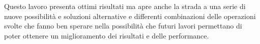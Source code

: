 \documentclass[10pt,twocolumn,letterpaper]{article}
\begin{document}
Questo lavoro presenta ottimi risultati ma apre anche la strada a una serie di nuove possibilità e soluzioni alternative e differenti combinazioni delle operazioni svolte che fanno ben sperare nella possibilità che futuri lavori permettano di poter ottenere un miglioramento dei risultati e delle performance.

{\small


}
\end{document}
